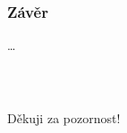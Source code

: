 \documentclass[%
  12pt,       				%
	t,                  %
	aspectratio=1610,   %
	unicode,						%
]{beamer}				    	%
\begin{document}
\begin{frame} 
	\frametitle{Závěr}
	\dots
\end{frame}


\begin{frame}[c] 
	\frametitle{\mbox{ }}
	\begin{center}
		{\Huge Děkuji za pozornost!}
	\end{center}
\end{frame}

\end{document}
